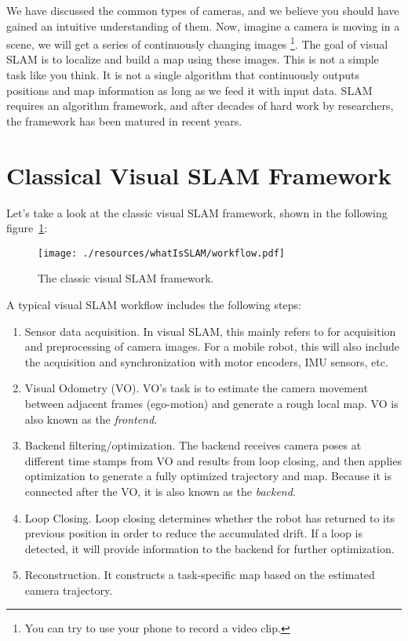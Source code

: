 We have discussed the common types of cameras, and we believe you should have gained an intuitive understanding of them. Now, imagine a camera is moving in a scene, we will get a series of continuously changing images \footnote{You can try to use your phone to record a video clip.}. The goal of visual SLAM is to localize and build a map using these images. This is not a simple task like you think. It is not a single algorithm that continuously outputs positions and map information as long as we feed it with input data. SLAM requires an algorithm framework, and after decades of hard work by researchers, the framework has been matured in recent years.

\section{Classical Visual SLAM Framework}

Let's take a look at the classic visual SLAM framework, shown in the following figure~\ref{fig:workflow}:

\begin{figure}
    \centering
    \texttt{[image: ./resources/whatIsSLAM/workflow.pdf]}
    \caption{The classic visual SLAM framework.}
    \label{fig:workflow}
\end{figure}

A typical visual SLAM workflow  includes the following steps:
\begin{enumerate}
\item{Sensor data acquisition}. In visual SLAM, this mainly refers to for acquisition and preprocessing of camera images. For a mobile robot, this will also include the acquisition and synchronization with motor encoders, IMU sensors, etc.
\item{Visual Odometry (VO)}. VO's task is to estimate the camera movement between adjacent frames (ego-motion) and generate a rough local map. VO is also known as the \emph{frontend}.
\item{Backend filtering/optimization}. The backend receives camera poses at different time stamps from VO and results from loop closing, and then applies optimization to generate a fully optimized trajectory and map. Because it is connected after the VO, it is also known as the \textit{backend}.
\item {Loop Closing}. Loop closing determines whether the robot has returned to its previous position in order to reduce the accumulated drift. If a loop is detected, it will provide information to the backend for further optimization.
\item {Reconstruction}. It constructs a task-specific map based on the estimated camera trajectory.
\end{enumerate}

